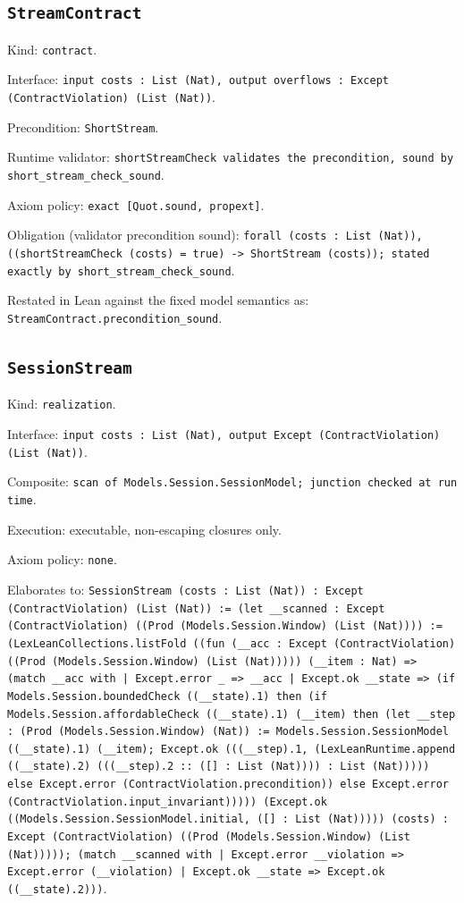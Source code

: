 \documentclass[11pt]{article}
\begin{document}
\subsection*{\texttt{StreamContract}}
\noindent Kind: \texttt{contract}.\par
\noindent Interface: \texttt{input costs : List (Nat), output overflows : Except (ContractViolation) (List (Nat))}.\par
\noindent Precondition: \texttt{ShortStream}.\par
\noindent Runtime validator: \texttt{shortStreamCheck validates the precondition, sound by short\_stream\_check\_sound}.\par
\noindent Axiom policy: \texttt{exact [Quot.sound, propext]}.\par
\noindent Obligation (validator precondition sound): \texttt{forall (costs : List (Nat)), ((shortStreamCheck (costs) = true) -> ShortStream (costs)); stated exactly by short\_stream\_check\_sound}.\par
\noindent Restated in Lean against the fixed model semantics as: \texttt{StreamContract.precondition\_sound}.\par
\subsection*{\texttt{SessionStream}}
\noindent Kind: \texttt{realization}.\par
\noindent Interface: \texttt{input costs : List (Nat), output Except (ContractViolation) (List (Nat))}.\par
\noindent Composite: \texttt{scan of Models.Session.SessionModel; junction checked at run time}.\par
\noindent Execution: executable, non-escaping closures only.\par
\noindent Axiom policy: \texttt{none}.\par
\noindent Elaborates to: \texttt{SessionStream (costs : List (Nat)) : Except (ContractViolation) (List (Nat)) := (let \_\_scanned : Except (ContractViolation) ((Prod (Models.Session.Window) (List (Nat)))) := (LexLeanCollections.listFold ((fun (\_\_acc : Except (ContractViolation) ((Prod (Models.Session.Window) (List (Nat))))) (\_\_item : Nat) => (match \_\_acc with | Except.error \_ => \_\_acc | Except.ok \_\_state => (if Models.Session.boundedCheck ((\_\_state).1) then (if Models.Session.affordableCheck ((\_\_state).1) (\_\_item) then (let \_\_step : (Prod (Models.Session.Window) (Nat)) := Models.Session.SessionModel ((\_\_state).1) (\_\_item); Except.ok (((\_\_step).1, (LexLeanRuntime.append ((\_\_state).2) (((\_\_step).2 :: ([] : List (Nat)))) : List (Nat))))) else Except.error (ContractViolation.precondition)) else Except.error (ContractViolation.input\_invariant))))) (Except.ok ((Models.Session.SessionModel.initial, ([] : List (Nat))))) (costs) : Except (ContractViolation) ((Prod (Models.Session.Window) (List (Nat))))); (match \_\_scanned with | Except.error \_\_violation => Except.error (\_\_violation) | Except.ok \_\_state => Except.ok ((\_\_state).2)))}.\par
\end{document}
